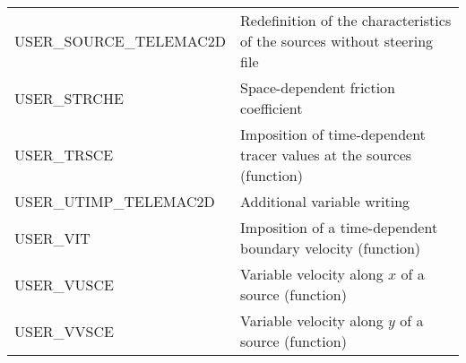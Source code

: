 \begin{tabular}{p{}p{4.0in}}
USER\_SOURCE\_TELEMAC2D & Redefinition of the characteristics of the sources without steering file\\
USER\_STRCHE & Space-dependent friction coefficient\\
USER\_TRSCE & Imposition of time-dependent tracer values at the sources (function)\\
USER\_UTIMP\_TELEMAC2D & Additional variable writing\\
USER\_VIT   & Imposition of a time-dependent boundary velocity (function)\\
USER\_VUSCE & Variable velocity along $x$ of a source (function)\\
USER\_VVSCE & Variable velocity along $y$ of a source (function)\\
\end{tabular}
